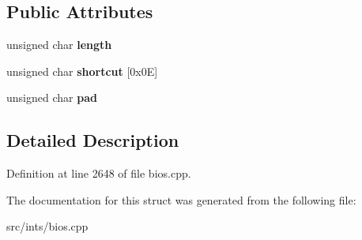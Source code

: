 \subsection*{Public Attributes}
\begin{DoxyCompactItemize}
\item 
\hypertarget{structpc98__func__key__shortcut__def_abaceed1a1548b1e78e9f5efce59e52db}{unsigned char {\bfseries length}}\label{structpc98__func__key__shortcut__def_abaceed1a1548b1e78e9f5efce59e52db}

\item 
\hypertarget{structpc98__func__key__shortcut__def_a073430a78271a50b611f35bd105253ab}{unsigned char {\bfseries shortcut} \mbox{[}0x0\-E\mbox{]}}\label{structpc98__func__key__shortcut__def_a073430a78271a50b611f35bd105253ab}

\item 
\hypertarget{structpc98__func__key__shortcut__def_a990a1f47feb6015883e885481702bd07}{unsigned char {\bfseries pad}}\label{structpc98__func__key__shortcut__def_a990a1f47feb6015883e885481702bd07}

\end{DoxyCompactItemize}


\subsection{Detailed Description}


Definition at line 2648 of file bios.\-cpp.



The documentation for this struct was generated from the following file\-:\begin{DoxyCompactItemize}
\item 
src/ints/bios.\-cpp\end{DoxyCompactItemize}

